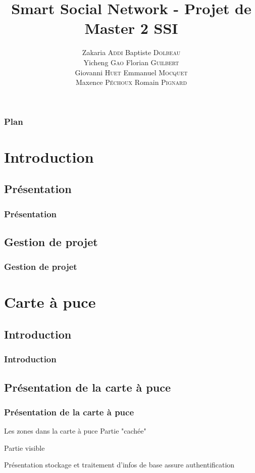 \documentclass{beamer}
\title{Smart Social Network - Projet de Master 2 SSI}
\author{
    Zakaria \textsc{Addi}
    Baptiste \textsc{Dolbeau}\\
    Yicheng \textsc{Gao}
    Florian \textsc{Guilbert}\\
    Giovanni \textsc{Huet}
    Emmanuel \textsc{Mocquet}\\
    Maxence \textsc{Péchoux}
    Romain \textsc{Pignard}
}
\institute{Université de Rouen}
\begin{document}
\begin{frame}
\titlepage 
\end{frame}

\begin{frame}
\frametitle{Plan}
\tableofcontents[hideallsubsections]
\end{frame}

\section{Introduction}

\subsection{Présentation}
\begin{frame}
    \frametitle{Présentation}
    \begin{block}{ }
    \end{block}
\end{frame}

\subsection{Gestion de projet}
\begin{frame}
    \frametitle{Gestion de projet}
    \begin{block}{ }
    \end{block}
\end{frame}

\section{Carte à puce}

\subsection{Introduction}
\begin{frame}
    \frametitle{Introduction}
    \begin{block}{}
    \end{block}
\end{frame}

\subsection{Présentation de la carte à puce}
\begin{frame}

    \frametitle{Présentation de la carte à puce}
    \begin{block}{Les zones dans la carte à puce}
        Partie "cachée" 

        Partie visible
    \end{block}
    \begin{block}{Présentation}
        stockage et traitement d'infos
        de base assure authentification

    \end{block}
\end{frame}
\end{document}

